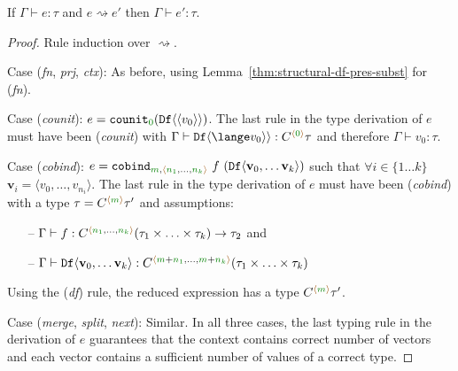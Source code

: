\begin{theorem}
\label{thm:structural-df-pres}
  If $\Gamma \vdash e : \tau$ and $e \rightsquigarrow e'$ then $\Gamma \vdash e' : \tau$.
\end{theorem}
\begin{proof}
  Rule induction over $\rightsquigarrow$.

\vspace{0.25em}\noindent\hangindent=0.6cm
Case (\emph{fn}, \emph{prj}, \emph{ctx}): As before, using Lemma~\ref{thm:structural-df-pres-subst} for (\emph{fn}).

\vspace{0.25em}\noindent\hangindent=0.6cm
Case (\emph{counit}): $e = \ident{counit}_{\cclrd{0}}(\ident{Df} \langle\langle v_0 \rangle\rangle)$. The last rule in the type
  derivation of $e$ must have been (\emph{counit}) with $\Gamma \vdash \ident{Df} \langle\lange v_0 \rangle\rangle : \ctyp{\alift{\cclrd{0}}}\tau$
  and therefore $\Gamma \vdash v_0 : \tau$.

\vspace{0.25em}\noindent\hangindent=0.6cm
Case (\emph{cobind}): $e = \ident{cobind}_{\cclrd{m}, \alift{\cclrd{n_1},\ldots,\cclrd{n_k}}}~f~(\ident{Df}\langle \textbf{v}_0, \ldots \textbf{v}_{k} \rangle)$
  such that $\forall i\in\{1\ldots k\}$ $\textbf{v}_i = \langle v_0, \ldots, v_{n_i}\rangle$. The last rule in the type derivation of $e$ must have been
  (\emph{cobind}) with a type $\tau = \ctyp{\alift{\cclrd{m}}}\tau'$ and assumptions:
\begin{itemize}[noitemsep,leftmargin=1.5cm,topsep=0pt]
  \item[--] $\Gamma \vdash f : \ctyp{\alift{\cclrd{n_1},\ldots,\cclrd{n_k}}}{(\tau_1\times\ldots\times\tau_k)} \rightarrow \tau_2$ and
  \item[--] $\Gamma \vdash \ident{Df}\langle \textbf{v}_0, \ldots \textbf{v}_{k} \rangle : \ctyp{\alift{\cclrd{m}+\cclrd{n_1},\ldots,\cclrd{m}+\cclrd{n_k}}}{(\tau_1\times\ldots\times\tau_k)}$
\end{itemize}
%
\hspace{0.5cm} Using the (\emph{df}) rule, the reduced expression has a type $\ctyp{\alift{\cclrd{m}}}\tau'$.

\vspace{0.25em}\noindent\hangindent=0.6cm
Case (\emph{merge}, \emph{split}, \emph{next}): Similar. In all three cases, the last typing rule in the derivation of $e$
  guarantees that the context contains correct number of vectors and each vector contains a
  sufficient number of values of a correct type.
\end{proof}


